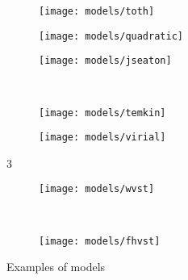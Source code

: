 \begin{figure}[p!]
    
    \begin{subfigure}{0.3\linewidth}
        \parbox[c]{0.1\linewidth}{\caption{}%
            \label{pyg:fgr:tothex}}
        \parbox[b]{0.7\linewidth}{%
            \texttt{[image: models/toth]}}
    \end{subfigure}
    \begin{subfigure}{0.3\linewidth}
        \parbox[c]{0.1\linewidth}{\caption{}%
            \label{pyg:fgr:quadraticex}}
        \parbox[b]{0.7\linewidth}{%
            \texttt{[image: models/quadratic]}}
    \end{subfigure}
    \begin{subfigure}{0.3\linewidth}
        \parbox[c]{0.1\linewidth}{\caption{}%
            \label{pyg:fgr:jseatonex}}
        \parbox[b]{0.7\linewidth}{%
            \texttt{[image: models/jseaton]}}
    \end{subfigure}
    \\
    \begin{subfigure}{0.3\linewidth}
        \parbox[c]{0.1\linewidth}{\caption{}%
            \label{pyg:fgr:temkinex}}
        \parbox[b]{0.7\linewidth}{%
            \texttt{[image: models/temkin]}}
    \end{subfigure}
    \begin{subfigure}{0.3\linewidth}
        \parbox[c]{0.1\linewidth}{\caption{}%
            \label{pyg:fgr:virialex}}
        \parbox[b]{0.7\linewidth}{%
            \texttt{[image: models/virial]}}
    \end{subfigure}3
    \begin{subfigure}{0.3\linewidth}
        \parbox[c]{0.1\linewidth}{\caption{}%
            \label{pyg:fgr:wsvstex}}
        \parbox[b]{0.7\linewidth}{%
            \texttt{[image: models/wvst]}}
    \end{subfigure}
    \\
    \begin{subfigure}{0.3\linewidth}
        \parbox[c]{0.1\linewidth}{\caption{}%
            \label{pyg:fgr:fhvstex}}
        \parbox[b]{0.7\linewidth}{%
            \texttt{[image: models/fhvst]}}
    \end{subfigure}

    \caption{Examples of models }%
    \label{pyg:fgr:modelex}
\end{figure}